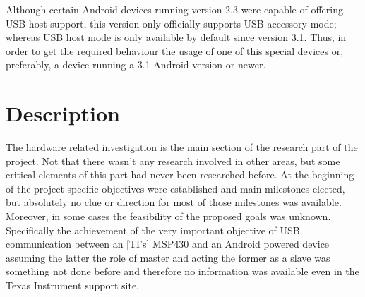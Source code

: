 			Although certain Android devices running version 2.3 were capable of offering USB host support, this
			version only officially supports USB accessory mode; whereas USB host mode is only available by
			default since version 3.1. Thus, in order to get the required behaviour the usage of one of this
			special devices or, preferably, a device running a 3.1 Android version or newer.

	\section{Description}
	\label{sec:hw-descr}



	The hardware related investigation is the main section of the research part of the project. Not that there wasn't any research involved in other areas, but some critical elements of this part had never been researched before. 
	At the beginning of the project specific objectives were established and main milestones elected, but absolutely no clue or direction for most of those milestones was available.
	Moreover, in some cases the feasibility of the proposed goals was unknown. Specifically the achievement of the very important objective of USB communication between an [TI's] MSP430 %
	and an Android powered device assuming the latter the role of master and acting the former as a slave was something not done before and therefore no information was available  even in the Texas Instrument support site.\\


